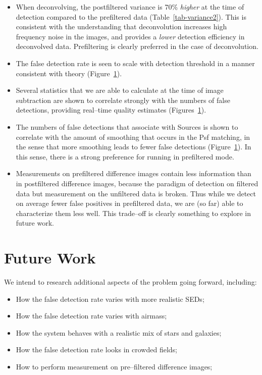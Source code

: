 \documentclass[prd, nofootinbib, floatfix, 11pt,tightenlines,times]{article}
\begin{document}
\begin{itemize}
\item When deconvolving, the postfiltered variance is 70\% {\it
  higher} at the time of detection compared to the prefiltered data
  (Table~\ref{tab-variance2}).  This is consistent with the
  understanding that deconvolution increases high frequency noise in
  the images, and provides a {\it lower} detection efficiency in
  deconvolved data.  Prefiltering is clearly preferred in the case of
  deconvolution.

\item The false detection rate is seen to scale with detection
  threshold in a manner consistent with theory (Figure~\ref{}).

\item Several statistics that we are able to calculate at the time of
  image subtraction are shown to correlate strongly with the numbers
  of false detections, providing real--time quality estimates
  (Figures~\ref{}).

\item The numbers of false detections that associate with Sources is
  shown to correlate with the amount of smoothing that occurs in the
  Psf matching, in the sense that more smoothing leads to fewer false
  detections (Figure~\ref{}).  In this sense, there is a strong
  preference for running in prefiltered mode.

\item Measurements on prefiltered difference images contain less
  information than in postfiltered difference images, because the
  paradigm of detection on filtered data but measurement on the
  unfiltered data is broken.  Thus while we detect on average fewer
  false positives in prefiltered data, we are (so far) able to
  characterize them less well.  This trade--off is clearly something
  to explore in future work.

\end{itemize}

\section{Future Work}

We intend to research additional aspects of the problem going forward,
including:
\begin{itemize}
\item How the false detection rate varies with more realistic SEDs;
\item How the false detection rate varies with airmass;
\item How the system behaves with a realistic mix of stars and galaxies;
\item How the false detection rate looks in crowded fields;
\item How to perform measurement on pre--filtered difference images;
\end{itemize}
\end{document}
